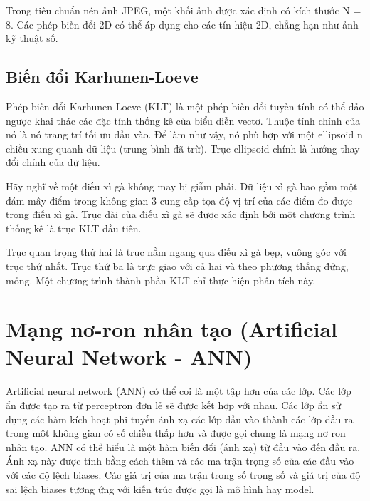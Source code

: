 Trong tiêu chuẩn nén ảnh JPEG, một khối ảnh được xác định có kích thước N = 8.
Các phép biến đổi 2D có thể áp dụng cho các tín hiệu 2D, chẳng hạn như ảnh kỹ
thuật số.



\subsection{Biến đổi Karhunen-Loeve}

Phép biến đổi Karhunen-Loeve (KLT) là một phép biến đổi tuyến tính
có thể đảo ngược khai thác các đặc tính thống kê của biểu diễn vectơ.
Thuộc tính chính của nó là nó trang trí tối ưu đầu vào. Để làm như vậy,
nó phù hợp với một ellipsoid n chiều xung quanh dữ liệu (trung bình đã trừ).
Trục ellipsoid chính là hướng thay đổi chính của dữ liệu.

Hãy nghĩ về một điếu xì gà không may bị giẫm phải. Dữ liệu xì
gà bao gồm một đám mây điểm trong không gian 3 cung cấp tọa độ vị trí của các điểm đo được trong điếu xì gà. Trục dài của điếu xì gà sẽ được xác định bởi một chương trình thống kê là trục KLT đầu tiên.

Trục quan trọng thứ hai là trục nằm ngang qua điếu xì gà bẹp,
vuông góc với trục thứ nhất. Trục thứ ba là trực giao với cả hai
và theo phương thẳng đứng, mỏng. Một chương trình thành phần KLT chỉ
thực hiện phân tích này.

\section{Mạng nơ-ron nhân tạo (Artificial Neural Network - ANN)}

Artificial neural network (ANN) có thể coi là một tập hơn của các lớp.
Các lớp ẩn được tạo ra từ perceptron đơn lẻ sẽ được kết hợp với nhau.
Các lớp ẩn sử dụng các hàm kích hoạt phi tuyến ánh xạ các lớp đầu vào
thành các lớp đầu ra trong một không gian có số chiều thấp hơn và được
gọi chung là mạng nơ ron nhân tạo. ANN có thể hiểu là một hàm biến đổi
(ánh xạ) từ đầu vào đến đầu ra. Ánh xạ này được tính bằng cách thêm và
các ma trận trọng số của các đầu vào với các độ lệch biases. Các giá
trị của ma trận trong số trọng số và giá trị của độ sai lệch biases
tương ứng với kiến trúc được gọi là mô hình hay model.

